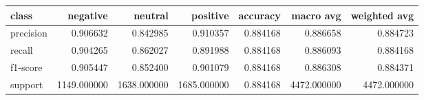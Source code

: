 \begin{tabular}{lrrrrrr}
\toprule
class & negative & neutral & positive & accuracy & macro avg & weighted avg \\
\midrule
precision & 0.906632 & 0.842985 & 0.910357 & 0.884168 & 0.886658 & 0.884723 \\
recall & 0.904265 & 0.862027 & 0.891988 & 0.884168 & 0.886093 & 0.884168 \\
f1-score & 0.905447 & 0.852400 & 0.901079 & 0.884168 & 0.886308 & 0.884371 \\
support & 1149.000000 & 1638.000000 & 1685.000000 & 0.884168 & 4472.000000 & 4472.000000 \\
\bottomrule
\end{tabular}
